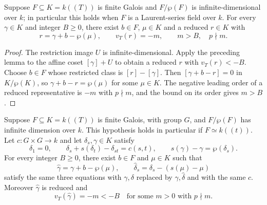 \begin{lemma}
\label{lem:artin-schreier-deep-parameter-adjustment}
\leanok
Suppose $F\subseteq K=k((T))$ is finite Galois and $F/\wp(F)$
is infinite-dimensional over $k$; in particular this holds when
$F$ is a Laurent-series field over $k$. For every $\gamma\in K$
and integer $B\ge0$, there exist $b\in F$, $\mu\in K$ and a reduced
$r\in K$ with
\[
 r=\gamma+b-\wp(\mu),\qquad v_T(r)=-m,
 \qquad m>B,\quad p\nmid m.
\]
\end{lemma}

\begin{proof}
The restriction image $U$ is infinite-dimensional. Apply the
preceding lemma to the affine coset $[\gamma]+U$ to obtain a
reduced $r$ with $v_T(r)<-B$. Choose $b\in F$ whose restricted
class is $[r]-[\gamma]$. Then $[\gamma+b-r]=0$ in $K/\wp(K)$,
so $\gamma+b-r=\wp(\mu)$ for some $\mu\in K$.
The negative leading order of a reduced representative is $-m$
with $p\nmid m$, and the bound on its order gives $m>B$.
\end{proof}

\begin{theorem}
\label{thm:witt-simultaneous-pole-adjustment}
\leanok
Suppose $F\subseteq K=k((T))$ is finite Galois,
with group $G$, and $F/\wp(F)$ has infinite dimension over $k$.
This hypothesis holds in particular if $F\simeq k((t))$. Let $c:G\times G\to k$ and let
$\delta_s,\gamma\in K$ satisfy
\[
 \delta_1=0,\qquad
 \delta_s+s(\delta_t)-\delta_{st}=c(s,t),\qquad
 s(\gamma)-\gamma=\wp(\delta_s).
\]
For every integer $B\ge0$, there exist $b\in F$ and
$\mu\in K$ such that
\[
 \widehat\gamma=\gamma+b-\wp(\mu),\qquad
 \widehat\delta_s=\delta_s-(s(\mu)-\mu)
\]
satisfy the same three equations with $\gamma,\delta$
replaced by $\widehat\gamma,\widehat\delta$ and with the
same $c$. Moreover $\widehat\gamma$ is reduced and
\[
 v_T(\widehat\gamma)=-m<-B
 \quad\text{for some }m>0\text{ with }p\nmid m.
\]
\end{theorem}

